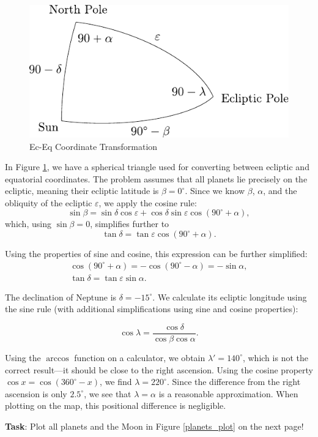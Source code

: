 \documentclass[a4paper,12pt]{extarticle}
\begin{document}
\begin{sol}
\begin{figure}[H]
	\centering
	\includegraphics[width=0.5\linewidth]{liptosvka4.pdf}
	\caption{Ec-Eq Coordinate Transformation}
	\label{eq_ec}
\end{figure}

In Figure \ref{eq_ec}, we have a spherical triangle used for converting between ecliptic and equatorial coordinates. The problem assumes that all planets lie precisely on the ecliptic, meaning their ecliptic latitude is \(\beta = 0^\circ\). Since we know \(\beta\), \(\alpha\), and the obliquity of the ecliptic \(\varepsilon\), we apply the cosine rule:
\[
\sin \beta = \sin \delta \cos \varepsilon + \cos \delta \sin \varepsilon \cos(90^\circ + \alpha),
\]
which, using \(\sin \beta = 0\), simplifies further to
\[
\tan \delta = \tan \varepsilon \cos(90^\circ + \alpha).
\]

Using the properties of sine and cosine, this expression can be further simplified:
\begin{gather*}
	\cos(90^\circ + \alpha) = -\cos(90^\circ - \alpha) = -\sin \alpha,\\
	\tan \delta = \tan \varepsilon \sin \alpha.
\end{gather*}

The declination of Neptune is \(\delta = -15^\circ\). We calculate its ecliptic longitude using the sine rule (with additional simplifications using sine and cosine properties):

\[
\cos \lambda = \frac{\cos \delta}{\cos \beta \cos \alpha}.
\]

Using the \(\arccos\) function on a calculator, we obtain \(\lambda' = 140^\circ\), which is not the correct result—it should be close to the right ascension. Using the cosine property \(\cos x = \cos(360^\circ - x)\), we find \(\lambda = 220^\circ\). Since the difference from the right ascension is only \(2.5^\circ\), we see that \(\lambda = \alpha\) is a reasonable approximation. When plotting on the map, this positional difference is negligible.
\end{sol}
\begin{pro}
\textbf{Task}: Plot all planets and the Moon in Figure \ref{planets_plot} on the next page!
\end{pro}
\end{document}

